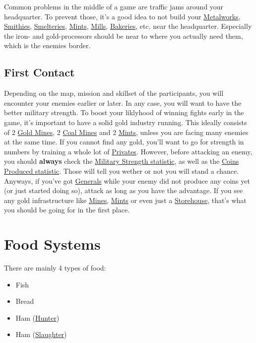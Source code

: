 \documentclass[11pt]{article}
\begin{document}
Common problems in the middle of a game are traffic jams around your headquarter. To prevent those, it's a good idea to not build your \hyperref[metalworks]{Metalworks}, \hyperref[smithy]{Smithies}, \hyperref[smeltery]{Smelteries}, \hyperref[mint]{Mints}, \hyperref[mill]{Mills}, \hyperref[bakery]{Bakeries}, etc. near the headquarter. Especially the iron- and gold-processors should be near to where you actually need them, which is the enemies border.

\subsection{First Contact}
\label{sec:firstcontact}

Depending on the map, mission and skillset of the participants, you will encounter your enemies earlier or later. In any case, you will want to have the better military strength. To boost your liklyhood of winning fights  early in the game, it's important to have a solid gold industry running. This ideally consists of 2 \hyperref[goldmine]{Gold Mines}, 2 \hyperref[coalmine]{Coal Mines} and 2 \hyperref[mint]{Mints}, unless you are facing many enemies at the same time. If you cannot find any gold, you'll want to go for strength in numbers by training a whole lot of \hyperref[private]{Privates}. However, before attacking an enemy, you should \textbf{always} check the \hyperref[statisticsmilitary]{Military Strength statistic}, as well as the \hyperref[statisticscoins]{Coins Produced statistic}. Those will tell you wether or not you will stand a chance. Anyways, if you've got \hyperref[general]{Generals} while your enemy did not produce any coins yet (or just started doing so), attack as long as you have the advantage. If you see any gold infrastructure like \hyperref[goldmine]{Mines}, \hyperref[mint]{Mints} or even just a \hyperref[storehouse]{Storehouse}, that's what you should be going for in the first place.

\section{Food Systems}
\label{sec:foodsystems}

There are mainly 4 types of food:

\begin{itemize}
  \item Fish
  \item Bread
  \item Ham (\hyperref[hunter]{Hunter})
  \item Ham (\hyperref[slaughterhouse]{Slaughter})
\end{itemize}
\end{document}
